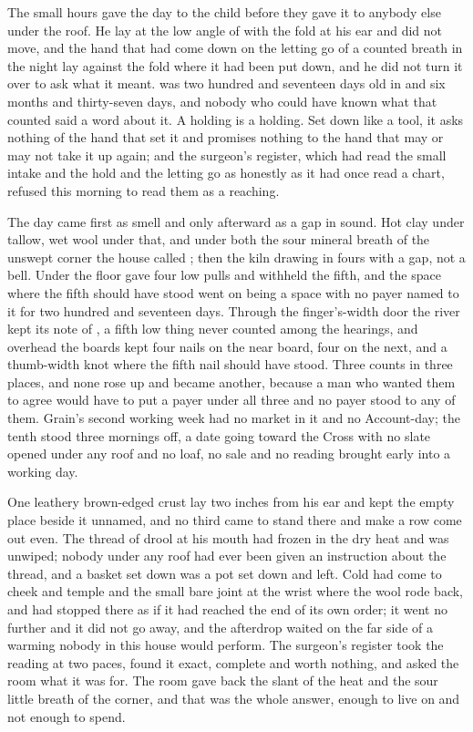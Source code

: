 
The small hours gave the day to the child before they gave it to anybody else under the roof. He lay at the low angle of  with the fold at his ear and did not move, and the hand that had come down on the letting go of a counted breath in the night lay against the fold where it had been put down, and he did not turn it over to ask what it meant.  was two hundred and seventeen days old in  and six months and thirty-seven days, and nobody who could have known what that counted said a word about it. A holding is a holding. Set down like a tool, it asks nothing of the hand that set it and promises nothing to the hand that may or may not take it up again; and the surgeon's register, which had read the small intake and the hold and the letting go as honestly as it had once read a chart, refused this morning to read them as a reaching.

The day came first as smell and only afterward as a gap in sound. Hot clay under tallow, wet wool under that, and under both the sour mineral breath of the unswept corner the house called ; then the kiln drawing in fours with a gap, not a bell. Under the floor  gave four low pulls and withheld the fifth, and the space where the fifth should have stood went on being a space with no payer named to it for two hundred and seventeen days. Through the finger's-width door the river kept its note of , a fifth low thing never counted among the hearings, and overhead the boards kept four nails on the near board, four on the next, and a thumb-width knot where the fifth nail should have stood. Three counts in three places, and none rose up and became another, because a man who wanted them to agree would have to put a payer under all three and no payer stood to any of them. Grain's second working week had no market in it and no Account-day; the tenth stood three mornings off, a date going toward the Cross with no slate opened under any roof and no loaf, no sale and no reading brought early into a working day.

One leathery brown-edged crust lay two inches from his ear and kept the empty place beside it unnamed, and no third came to stand there and make a row come out even. The thread of drool at his mouth had frozen in the dry heat and was unwiped; nobody under any roof had ever been given an instruction about the thread, and a basket set down was a pot set down and left. Cold had come to cheek and temple and the small bare joint at the wrist where the wool rode back, and had stopped there as if it had reached the end of its own order; it went no further and it did not go away, and the afterdrop waited on the far side of a warming nobody in this house would perform. The surgeon's register took the reading at two paces, found it exact, complete and worth nothing, and asked the room what it was for. The room gave back the slant of the heat and the sour little breath of the corner, and that was the whole answer, enough to live on and not enough to spend.

